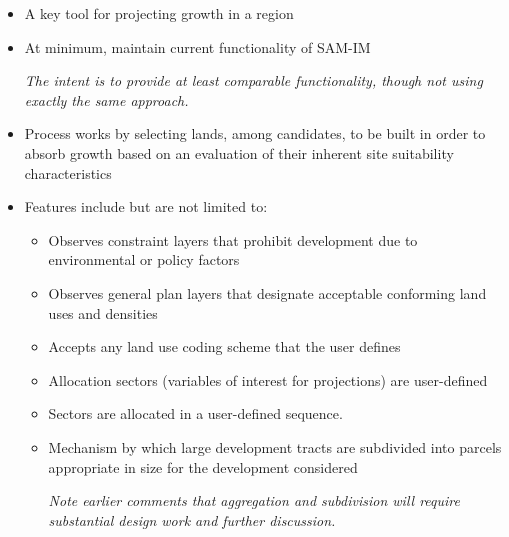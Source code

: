 \documentclass[titlepage]{article}
\begin{document}
\begin{itemize}
\item A key tool for projecting growth in a region
\item At minimum, maintain current functionality of SAM-IM

\emph{The intent is to provide at least comparable functionality, though not using exactly the same approach.}

\item Process works by selecting lands, among candidates, to be built in order to absorb growth based on an evaluation of their inherent site suitability characteristics
\item Features include but are not limited to:
\begin{itemize}
\item Observes constraint layers that prohibit development due to environmental or policy factors
\item Observes general plan layers that designate acceptable conforming land uses and densities
\item Accepts any land use coding scheme that the user defines
\item Allocation sectors (variables of interest for projections) are user-defined
\item Sectors are allocated in a user-defined sequence.
\item Mechanism by which large development tracts are subdivided into parcels appropriate in size for the development considered

\emph{Note earlier comments that aggregation and subdivision will require substantial design work and further discussion.}


\end{itemize}
\end{itemize}
\end{document}
